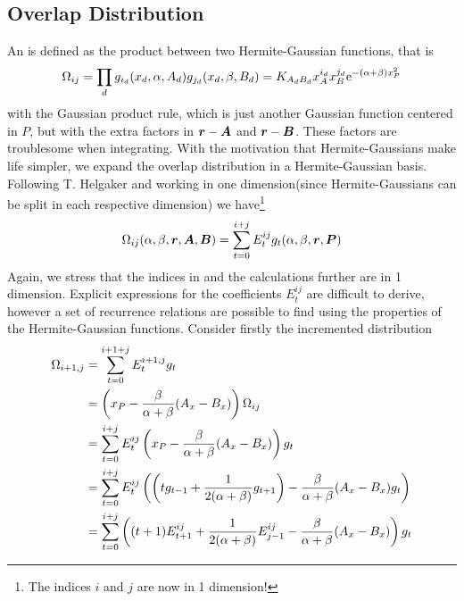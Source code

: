 \subsection{Overlap Distribution}
    An  is defined as the product between two
    Hermite-Gaussian functions, that is
        \begin{equation}
            \Omega_{ij} = \prod_d g_{i_d}(x_d,\alpha,A_d)g_{j_d}(x_d,\beta,B_d)
            =
            K_{A_dB_d}x_A^{i_d}x_B^{j_d}\mathrm{e}^{-(\alpha+\beta)x^2_P}
        \end{equation}
    with the Gaussian product rule, which is just another Gaussian function
    centered in $P$, but with the extra  factors in
    $\boldsymbol{{r}}-\boldsymbol{{A}}$ and $\boldsymbol{{r}}-\boldsymbol{{B}}$. These factors are troublesome
    when integrating. With the motivation that Hermite-Gaussians make life
    simpler, we expand the overlap distribution in a Hermite-Gaussian basis.
    Following T. Helgaker\cite{HelgakerTaylorGauss} and working in one
    dimension(since Hermite-Gaussians can be split in each respective
    dimension) we have\footnote{The indices $i$ and $j$ are now in 1
    dimension!}
        \begin{equation}
            \Omega_{ij}(\alpha,\beta,\blds{r},\blds{A},\blds{B}) =
            \sum\limits^{i+j}_{t=0} E^{ij}_tg_t(\alpha,\beta,\blds{r},\blds{P})
            \label{eq:omegaDef}
        \end{equation}
    Again, we stress that the indices in  and the calculations
    further are in 1 dimension. Explicit expressions for the coefficients
    $E^{ij}_t$ are difficult to derive, however a set of recurrence relations
    are possible to find using the properties of the Hermite-Gaussian
    functions. Consider firstly the incremented distribution
        \begin{align}
            \Omega_{i+1,j} &= \sum^{i+1+j}_{t=0} E^{i+1,j}_tg_t \nonumber \\
            &= \left(x_P -
            \frac{\beta}{\alpha+\beta}(A_x-B_x)\right)\Omega_{ij} \nonumber \\
            &= \suml{t=0}{i+j} E^{ij}_t\left(x_P -
            \frac{\beta}{\alpha+\beta}(A_x-B_x)\right) g_t \nonumber \\
            &= \suml{t=0}{i+j} E^{ij}_t\left(\left(tg_{t-1} +
            \frac{1}{2(\alpha+\beta)}g_{t+1}\right) -
            \frac{\beta}{\alpha+\beta}(A_x-B_x)g_t\right) \nonumber \\
            &= \suml{t=0}{i+j} \left((t+1)E^{ij}_{t+1} +
            \frac{1}{2(\alpha+\beta)}E^{ij}_{j-1} -
            \frac{\beta}{\alpha+\beta}(A_x-B_x)\right)g_t
            \label{eq:omegaIncr}
        \end{align}
